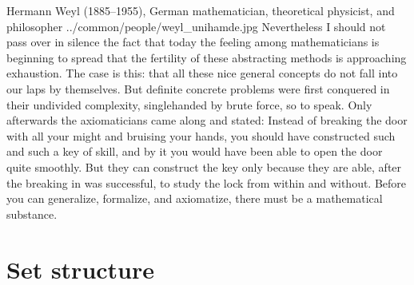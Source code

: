 \qboxnpq
  {Hermann Weyl (1885--1955), German mathematician, theoretical physicist, and philosopher \footnotemark}
  {../common/people/weyl_unihamde.jpg}
  {Nevertheless I should not pass over in silence the fact that today the feeling among mathematicians is beginning to spread 
   that the fertility of these abstracting methods is approaching exhaustion. 
   The case is this: that all these nice general concepts do not fall into our laps by themselves. 
   But definite concrete problems were first conquered in their undivided complexity, singlehanded by brute force, so to speak. 
   Only afterwards the axiomaticians came along and stated: 
   Instead of breaking the door with all your might and bruising your hands, 
   you should have constructed such and such a key of skill, and by it you would have been able to open the door quite smoothly. 
   But they can construct the key only because they are able, after the breaking in was successful, 
   to study the lock from within and without. 
   Before you can generalize, formalize, and axiomatize, there must be a mathematical substance.}

\section{Set structure}


